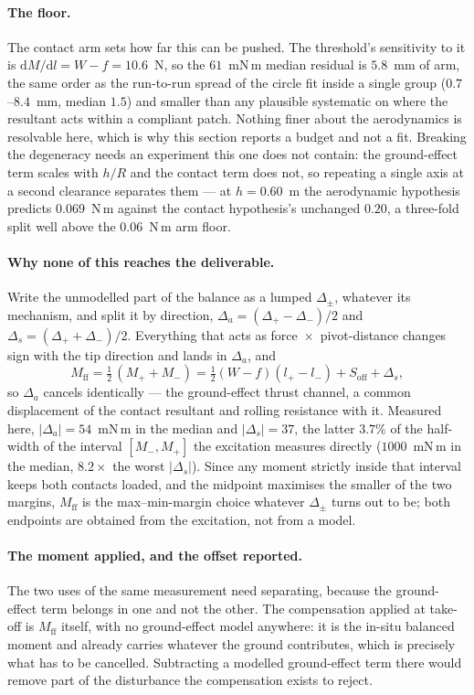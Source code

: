 \documentclass[10pt]{article}
\begin{document}
\paragraph{The floor.}
The contact arm sets how far this can be pushed. The threshold's
sensitivity to it is $\mathrm{d}M/\mathrm{d}l = W - f = 10.6$~N, so
the $61$~mN\,m median residual is $5.8$~mm of arm, the same order as
the run-to-run spread of the circle fit inside a single group
($0.7$--$8.4$~mm, median $1.5$) and smaller than any plausible
systematic on where the resultant acts within a compliant patch.
Nothing finer about the aerodynamics is resolvable here, which is why
this section reports a budget and not a fit. Breaking the degeneracy
needs an experiment this one does not contain: the ground-effect term
scales with $h/R$ and the contact term does not, so repeating a single
axis at a second clearance separates them --- at $h = 0.60$~m the
aerodynamic hypothesis predicts $0.069$~N\,m against the contact
hypothesis's unchanged $0.20$, a three-fold split well above the
$0.06$~N\,m arm floor.

\paragraph{Why none of this reaches the deliverable.}
Write the unmodelled part of the balance as a lumped $\Delta_{\pm}$,
whatever its mechanism, and split it by direction,
$\Delta_a = (\Delta_+ - \Delta_-)/2$ and
$\Delta_s = (\Delta_+ + \Delta_-)/2$. Everything that acts as
force~$\times$~pivot-distance changes sign with the tip direction and
lands in $\Delta_a$, and
\begin{equation}
M_{\mathrm{ff}} = \tfrac12\,(M_+ + M_-)
= \tfrac12(W-f)(l_+ - l_-) + S_{\mathrm{off}} + \Delta_s ,
\end{equation}
so $\Delta_a$ cancels identically --- the ground-effect thrust
channel, a common displacement of the contact resultant and rolling
resistance with it. Measured here, $|\Delta_a| = 54$~mN\,m in the
median and $|\Delta_s| = 37$, the latter $3.7\%$ of the half-width of
the interval $[M_-, M_+]$ the excitation measures directly
($1000$~mN\,m in the median, $8.2\times$ the worst $|\Delta_s|$).
Since any moment strictly inside that interval keeps both contacts
loaded, and the midpoint maximises the smaller of the two margins,
$M_{\mathrm{ff}}$ is the max--min-margin choice whatever
$\Delta_{\pm}$ turns out to be; both endpoints are obtained from the
excitation, not from a model.

\paragraph{The moment applied, and the offset reported.}
The two uses of the same measurement need separating, because the
ground-effect term belongs in one and not the other. The compensation
applied at take-off is $M_{\mathrm{ff}}$ itself, with no ground-effect
model anywhere: it is the in-situ balanced moment and already carries
whatever the ground contributes, which is precisely what has to be
cancelled. Subtracting a modelled ground-effect term there would
remove part of the disturbance the compensation exists to reject.
\end{document}
